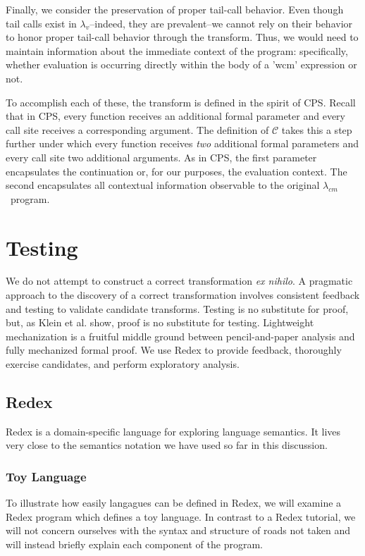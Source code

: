 \documentclass[ms,electronic,twosidetoc,letterpaper,chaptercenter,parttop]{byumsphd}
\newcommand{\lv}{$\lambda_v$}
\newcommand{\cm}{$\lambda_{cm}$}
\begin{document}
Finally, we consider the preservation of proper tail-call behavior. Even though tail calls exist in \lv--indeed, they are prevalent--we cannot rely on their behavior to honor proper tail-call behavior through the transform. Thus, we would need to maintain information about the immediate context of the program: specifically, whether evaluation is occurring directly within the body of a \scheme'wcm' expression or not.

To accomplish each of these, the transform is defined in the spirit of CPS. Recall that in
CPS, every function receives an additional formal parameter and every call site receives a
corresponding argument. The definition of $\mathcal{C}$ takes this a step further under
which every function receives \emph{two} additional formal parameters and every call site
two additional arguments. As in CPS, the first parameter encapsulates the continuation or,
for our purposes, the evaluation context. The second encapsulates all contextual
information observable to the original \cm\ program.

\chapter{Testing}

We do not attempt to construct a correct transformation \emph{ex nihilo}. A pragmatic
approach to the discovery of a correct transformation involves consistent feedback and
testing to validate candidate transforms. Testing is no substitute for proof, but, as
Klein et al. \cite{klein2012run} show, proof is no substitute for testing. Lightweight
mechanization is a fruitful middle ground between pencil-and-paper analysis and fully
mechanized formal proof. We use Redex to provide feedback, thoroughly exercise candidates,
and perform exploratory analysis.

\section{Redex}

Redex \cite{findler2010redex} is a domain-specific language for exploring language
semantics. It lives very close to the semantics notation we have used so far in this
discussion.

\subsection{Toy Language}
To illustrate how easily langagues can be defined in Redex, we will examine a Redex
program which defines a toy language. In contrast to a Redex tutorial, we will not concern
ourselves with the syntax and structure of roads not taken and will instead briefly
explain each component of the program.
\end{document}
